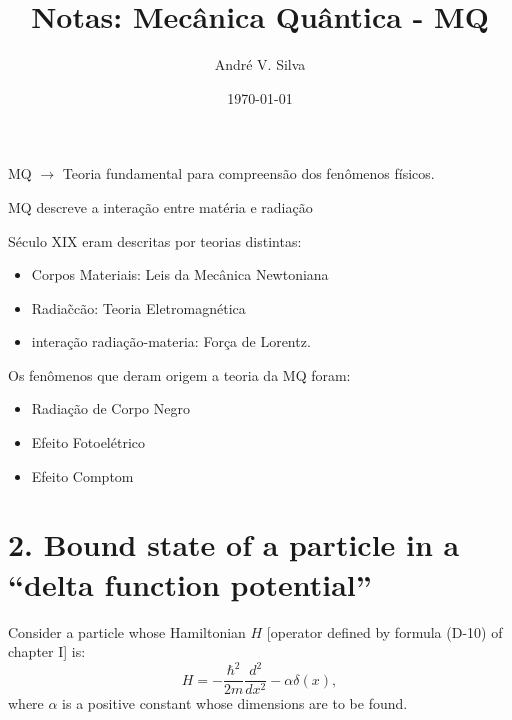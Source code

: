 \documentclass[a4paper,12pt]{article}
\title{ \textbf{\large Notas: Mec\^anica Qu\^antica - MQ} }
\author{Andr\'e V. Silva}
\date{\today}
\begin{document}
\maketitle

MQ $\rightarrow$ Teoria fundamental para compreens\~ao dos fen\^omenos f\'isicos.

MQ descreve a intera\c{c}\~ao entre mat\'eria e radia\c{c}\~ao

S\'eculo XIX eram descritas por teorias distintas:

\begin{itemize}
    \item Corpos Materiais: Leis da Mec\^anica Newtoniana
    \item Radia\~c{c}\~ao: Teoria Eletromagn\'etica
    \item intera\c{c}\~ao radia\c{c}\~ao-materia: For\c{c}a de Lorentz.
\end{itemize}

Os fen\^omenos que deram origem a teoria da MQ foram:

\begin{itemize}
    \item Radia\c{c}\~ao de Corpo Negro
    \item Efeito Fotoel\'etrico
    \item Efeito Comptom
\end{itemize}

\newpage
\section*{2. Bound state of a particle in a ``delta function potential''}

Consider a particle whose Hamiltonian \( H \) [operator defined by formula (D-10) of chapter I] is:
\[
H = -\frac{\hbar^2}{2m} \frac{d^2}{dx^2} - \alpha \delta(x),
\]
where \( \alpha \) is a positive constant whose dimensions are to be found.
\end{document}
